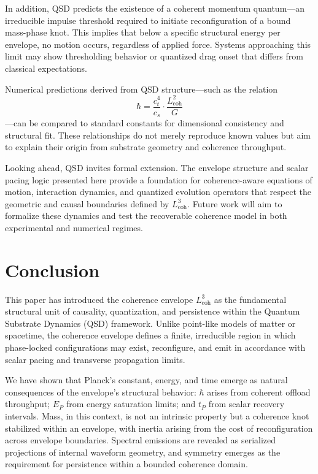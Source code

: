 \documentclass[entropy,article,submit,pdftex,oneauthor]{Definitions/mdpi}
\begin{document}
In addition, QSD predicts the existence of a coherent momentum quantum—an irreducible impulse threshold required to initiate reconfiguration of a bound mass-phase knot. This implies that below a specific structural energy per envelope, no motion occurs, regardless of applied force. Systems approaching this limit may show thresholding behavior or quantized drag onset that differs from classical expectations.

Numerical predictions derived from QSD structure—such as the relation \[
 \hbar = \frac{c_t^4}{c_s} \cdot \frac{L_{\text{coh}}^2}{G} 
\] —can be compared to standard constants for dimensional consistency and structural fit. These relationships do not merely reproduce known values but aim to explain their origin from substrate geometry and coherence throughput.

Looking ahead, QSD invites formal extension. The envelope structure and scalar pacing logic presented here provide a foundation for coherence-aware equations of motion, interaction dynamics, and quantized evolution operators that respect the geometric and causal boundaries defined by \( L_{\text{coh}}^3 \). Future work will aim to formalize these dynamics and test the recoverable coherence model in both experimental and numerical regimes.




\section{Conclusion}
This paper has introduced the coherence envelope \texorpdfstring{\( L_{\text{coh}}^3 \)}{Lcoh\^{}3} as the fundamental structural unit of causality, quantization, and persistence within the Quantum Substrate Dynamics (QSD) framework. Unlike point-like models of matter or spacetime, the coherence envelope defines a finite, irreducible region in which phase-locked configurations may exist, reconfigure, and emit in accordance with scalar pacing and transverse propagation limits.

We have shown that Planck’s constant, energy, and time emerge as natural consequences of the envelope’s structural behavior: \texorpdfstring{\( \hbar \)}{hbar} arises from coherent offload throughput; \texorpdfstring{\( E_P \)}{Ep} from energy saturation limits; and \texorpdfstring{\( t_P \)}{tP} from scalar recovery intervals. Mass, in this context, is not an intrinsic property but a coherence knot stabilized within an envelope, with inertia arising from the cost of reconfiguration across envelope boundaries. Spectral emissions are revealed as serialized projections of internal waveform geometry, and symmetry emerges as the requirement for persistence within a bounded coherence domain.
\end{document}
